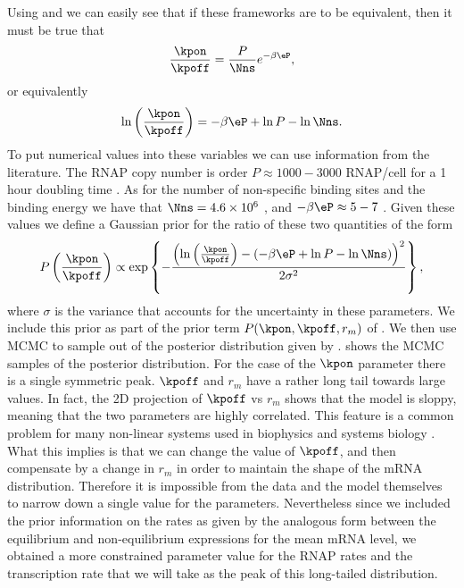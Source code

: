 Using  and  we can easily see that
if these frameworks are to be equivalent, then it must be true that
\begin{equation}
  {\kpon \over \kpoff} = {P \over \Nns} e^{-\beta\eP},
\end{equation}
or equivalently
\begin{equation}
  \ln \left({\kpon \over \kpoff}\right) =
  -\beta\eP + \ln P - \ln \Nns.
\end{equation}
To put numerical values into these variables we can use information from the
literature. The RNAP copy number is order $P \approx 1000-3000$ RNAP/cell for a
1 hour doubling time \cite{Klumpp2008}.
As for the number of non-specific
binding sites and the binding energy we have that $\Nns = 4.6\times 10^6$
\cite{Bintu2005a}, and $-\beta\eP \approx 5 - 7$
\cite{Brewster2012}. Given these values we define a Gaussian prior for the ratio
of these two quantities of the form
\begin{equation}
  P\left({\kpon \over \kpoff} \right) \propto
  \exp \left\{ - {\left(\ln \left({\kpon \over \kpoff}\right) -
  \left(-\beta\eP + \ln P - \ln \Nns \right) \right)^2
  \over 2 \sigma^2} \right\},
  \label{seq_prior_single}
\end{equation}
where $\sigma$ is the variance that accounts for the uncertainty in these
parameters. We include this prior as part of the prior term $P(\kpon, \kpoff,
r_m)$ of . We then use MCMC to sample out of the
posterior distribution given by . 
shows the MCMC samples of the posterior distribution. For the case of the
$\kpon$ parameter there is a single symmetric peak. $\kpoff$ and $r_m$ have a
rather long tail towards large values. In fact, the 2D projection of $\kpoff$ vs
$r_m$ shows that the model is sloppy, meaning that the two parameters are highly
correlated. This feature is a common problem for many non-linear systems used in
biophysics and systems biology \cite{Transtrum2015}. What this implies is that
we can change the value of $\kpoff$, and then compensate by a change in $r_m$ in
order to maintain the shape of the mRNA distribution. Therefore it is impossible
from the data and the model themselves to narrow down a single value for the
parameters. Nevertheless since we included the prior information on the rates as
given by the analogous form between the equilibrium and non-equilibrium
expressions for the mean mRNA level, we obtained a more constrained parameter
value for the RNAP rates and the transcription rate that we will take as the
peak of this long-tailed distribution.

